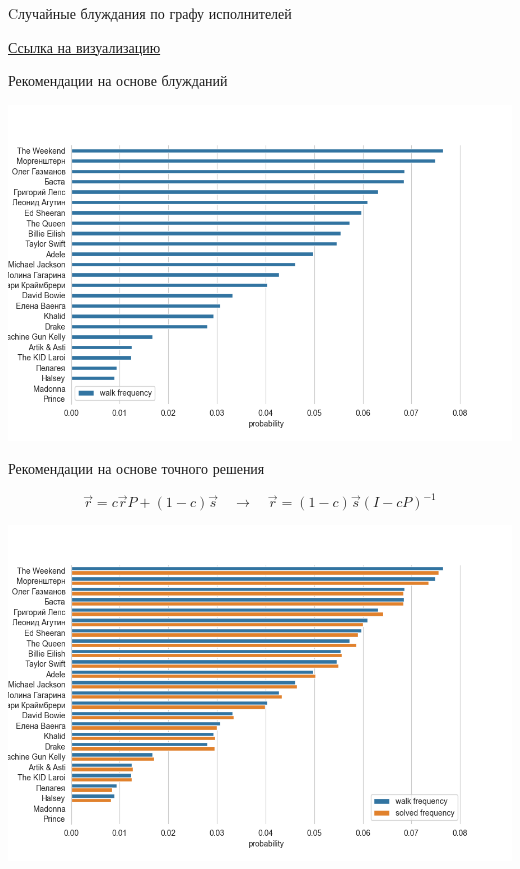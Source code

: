 \documentclass[11pt,aspectratio=169,handout]{beamer}
\begin{document}
\begin{frame}{Cлучайные блуждания по графу исполнителей}

\href{http://localhost:8888/lab/workspaces/auto-u/tree/images/random_walk.gif}{\color{blue}Ссылка на визуализацию}

\end{frame}

\begin{frame}{Рекомендации на основе блужданий}

\begin{center}
\includegraphics[scale=0.4]{images/recommendations-1.png}
\end{center}

\end{frame}

\begin{frame}{Рекомендации на основе точного решения}

\[
\vec{r} = c \vec{r} P + (1 - c) \vec{s} \quad \rightarrow \quad \vec{r} = (1 - c) \vec{s} \left(I - c P \right)^{-1}
\]

\begin{center}
\includegraphics[scale=0.4]{images/recommendations-2.png}
\end{center}

\end{frame}
\end{document}
